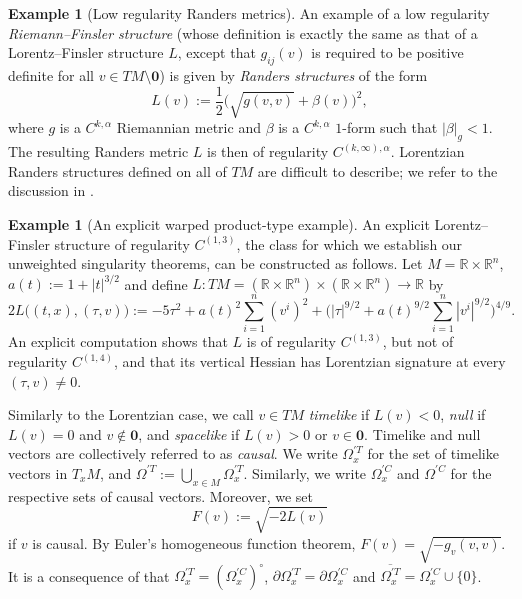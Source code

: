 \documentclass[a4paper,11pt]{article}
\numberwithin{equation}{section}
\theoremstyle{definition}
\newtheorem{Example}[Definition]{Example}
\theoremstyle{plain}
\newcommand{\R}{\mathbb R}
\begin{document}
\begin{Example}[Low regularity Randers metrics]\label{ex:Randers}
An example of a low regularity \emph{Riemann--Finsler structure} (whose definition is exactly the same as that of a Lorentz--Finsler structure $L$, except that $g_{ij}(v)$ is required to be positive definite for all $v \in TM \setminus \mathbf{0}$) is given by \emph{Randers structures} of the form
\begin{equation*}
    L(v):=\frac{1}{2}\bigl(\sqrt{g(v,v)} + \beta(v)\bigr)^2,
\end{equation*}
where $g$ is a $C^{k,\alpha}$ Riemannian metric and $\beta$ is a $C^{k,\alpha}$ $1$-form such that $|\beta|_g < 1$. 
The resulting Randers metric $L$ is then of regularity $C^{(k,\infty),\alpha}$. 
Lorentzian Randers structures defined on all of $TM$ are difficult to describe; we refer to the discussion in \cite{Minguzzi-LightconesFinsler}.
\end{Example}

\begin{Example}[An explicit warped product-type example]
An explicit Lorentz--Finsler structure of regularity $C^{(1,3)}$, the class for which we establish our unweighted singularity theorems, can be constructed as follows. 
Let $M = \R \times \R^n$, $a(t):=1 + |t|^{3/2}$ and define $L: TM = (\R \times \R^n) \times (\R \times \R^n) \to \R$ by
\begin{equation*}
    2L\bigl((t,x),(\tau,v)\bigr):= - 5\tau^2 + a(t)^2 \sum_{i= 1}^n (v^i)^2 + \biggl( |\tau|^{9/2} + a(t)^{9/2} \sum_{i=1}^n |v^i|^{9/2} \biggr)^{4/9}.
\end{equation*}
An explicit computation shows that $L$ is of regularity $C^{(1,3)}$, but not of regularity $C^{(1,4)}$, and that its vertical Hessian has Lorentzian signature at every $(\tau,v) \neq 0$.
\end{Example}

Similarly to the Lorentzian case, we call $v \in TM$ \emph{timelike} if $L(v) < 0$, \emph{null} if $L(v) = 0$ and $v \not\in \mathbf{0}$, and \emph{spacelike} if $L(v) > 0$ or $v \in \mathbf{0}$.
Timelike and null vectors are collectively referred to as \emph{causal}.
We write $\Omega_x^{'T}$ for the set of timelike vectors in $T_xM$, and $\Omega^{'T}:=\bigcup_{x \in M} \Omega_x^{'T}$. 
Similarly, we write $\Omega_x^{'C}$ and $\Omega^{'C}$ for the respective sets of causal vectors.
Moreover, we set
\[ F(v):=\sqrt{-2L(v)} \]
if $v$ is causal. By Euler's homogeneous function theorem, $F(v) = \sqrt{-g_v(v,v)}$. 
It is a consequence of \cite[Lem.\ 1]{Minguzzi-LightconesFinsler} that $\Omega^{'T}_x = (\Omega^{'C}_x)^\circ$, $\partial \Omega^{'T}_x = \partial \Omega^{'C}_x$ and $\overline{\Omega^{'T}_x} = \Omega^{'C}_x \cup \{0\}$.
\end{document}

